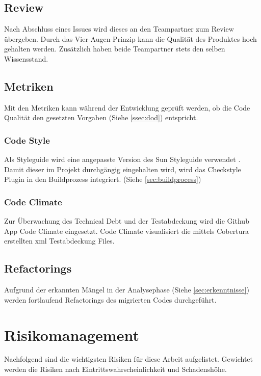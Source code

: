 \documentclass[11pt,a4paper,english,oneside]{book}
\numberwithin{equation}{chapter}
\begin{document}
	\subsection{Review}
	Nach Abschluss eines Issues wird dieses an den Teampartner zum Review übergeben. Durch das Vier-Augen-Prinzip kann die Qualität des Produktes hoch gehalten werden. Zusätzlich haben beide Teampartner stets den selben Wissensstand.
	
	\subsection{Metriken} \label{ssec:metriken}
	Mit den Metriken kann während der Entwicklung geprüft werden, ob die Code Qualität den gesetzten Vorgaben (Siehe \ref{ssec:dod}) entspricht.
	
	\subsubsection{Code Style}
	Als Styleguide wird eine angepasste Version des Sun Styleguide verwendet \cite{suncheckstyle}. Damit dieser im Projekt durchgängig eingehalten wird, wird das Checkstyle Plugin \cite{checkstyle} in den Buildprozess integriert. (Siehe \ref{sec:buildprocess})	
	
	\subsubsection{Code Climate}
	Zur Überwachung des Technical Debt und der Testabdeckung wird die Github App Code Climate \cite{codeclimate} eingesetzt. Code Climate visualisiert die mittels Cobertura \cite{cobertura} erstellten \gls{xml} Testabdeckung Files.
	
	\subsection{Refactorings}
	Aufgrund der erkannten Mängel in der Analysephase (Siehe \ref{sec:erkenntnisse}) werden fortlaufend Refactorings des migrierten Codes durchgeführt.

	\section{Risikomanagement}
	Nachfolgend sind die wichtigsten Risiken für diese Arbeit aufgelistet. Gewichtet werden die Risiken nach Eintrittswahrscheinlichkeit und Schadenshöhe. \cite{risikomanagement}
	
\end{document}
